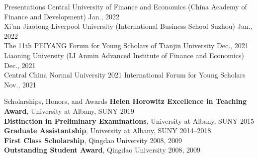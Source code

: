 \documentclass{resume_liang} %
\begin{document}
\begin{rSection}{Presentations} 
	{Central University of Finance and Economics (China Academy of Finance and Development)} \hfill{Jan., 2022}  
	\vspace{0.1cm}\\
	{Xi'an Jiaotong-Liverpool University (International Business School Suzhou)} \hfill{Jan., 2022}  
	\vspace{0.1cm}\\ 
	{The 11th PEIYANG Forum for Young Scholars of Tianjin University} \hfill{Dec., 2021}  
	\vspace{0.1cm}\\ 
	{Liaoning University (LI Anmin Advanced Institute of Finance and Economics)} \hfill{Dec., 2021}  
	\vspace{0.1cm}\\ 
	{Central China Normal University 2021 International Forum for Young Scholars} \hfill{Nov., 2021}  
	\vspace{0.1cm}
\end{rSection}
\bigskip  



\begin{rSection}{Scholarships, Honors, and Awards} 
{\bf Helen Horowitz Excellence in Teaching Award}{, University at Albany, SUNY} \hfill{2019}  \vspace{0.1cm}\\ 
{\bf Distinction in Preliminary Examinations}{, University at Albany, SUNY} \hfill{2015}  \vspace{0.1cm}\\
{\bf Graduate Assistantship}{, University at Albany, SUNY} \hfill{2014--2018}  
\vspace{0.1cm}\\
{\bf First Class Scholarship}{, Qingdao University} \hfill{2008, 2009} 
\vspace{0.1cm}\\
{\bf Outstanding Student Award}{, Qingdao University} \hfill{2008, 2009}  
\vspace{0.1cm}
\end{rSection}
\bigskip  
\end{document}
